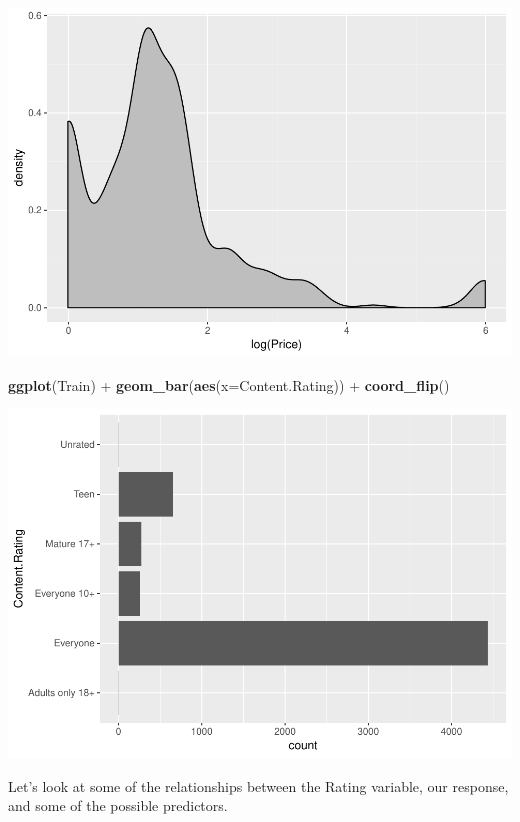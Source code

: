 \documentclass[]{article}
\newenvironment{Shaded}{\begin{snugshade}}{\end{snugshade}}
\newcommand{\KeywordTok}[1]{\textcolor[rgb]{0.13,0.29,0.53}{\textbf{{#1}}}}
\newcommand{\DataTypeTok}[1]{\textcolor[rgb]{0.13,0.29,0.53}{{#1}}}
\newcommand{\StringTok}[1]{\textcolor[rgb]{0.31,0.60,0.02}{{#1}}}
\newcommand{\NormalTok}[1]{{#1}}
\begin{document}
\includegraphics{Project_2_Work_files/figure-latex/unnamed-chunk-15-5.pdf}

\begin{Shaded}
\begin{Highlighting}[]
\KeywordTok{ggplot}\NormalTok{(Train) +}\StringTok{ }\KeywordTok{geom_bar}\NormalTok{(}\KeywordTok{aes}\NormalTok{(}\DataTypeTok{x=}\NormalTok{Content.Rating)) +}\StringTok{ }\KeywordTok{coord_flip}\NormalTok{()}
\end{Highlighting}
\end{Shaded}

\includegraphics{Project_2_Work_files/figure-latex/unnamed-chunk-15-6.pdf}

Let's look at some of the relationships between the Rating variable, our
response, and some of the possible predictors.
\end{document}
